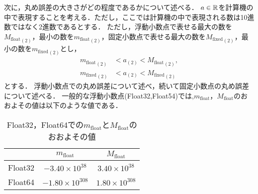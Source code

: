 次に，丸め誤差の大きさがどの程度であるかについて述べる．
$a \in \mathbb{R}$を計算機の中で表現することを考える．ただし，ここでは計算機の中で表現される数は10進数ではなく2進数であるとする．
ただし，浮動小数点で表せる最大の数を${M_{\mathrm{float}}}_{(2)}$，最小の数を${m_{\mathrm{float}}}_{(2)}$，固定小数点で表せる最大の数を${M_{\mathrm{fixed}}}_{(2)}$，最小の数を${m_{\mathrm{fixed}}}_{(2)}$とし，
\begin{align}
   {m_{\mathrm{float}}}_{(2)} &< a_{(2)} < {M_{\mathrm{float}}}_{(2)}, \\
   {m_{\mathrm{fixed}}}_{(2)} &< a_{(2)} < {M_{\mathrm{fixed}}}_{(2)}
\end{align}
とする．
浮動小数点での丸め誤差について述べ，続いて固定小数点の丸め誤差について述べる．
一般的な浮動小数点(Float32,Float54)では,$m_{\mathrm{float}}$，$M_{\mathrm{float}}$のおおよその値は以下のような値である．
\begin{table}[H]
    \centering
    \caption{Float32，Float64での$m_{\mathrm{float}}$と$M_{\mathrm{float}}$のおおよその値}
    \begin{tabular}{c|c|c}
         & $m_{\mathrm{float}}$ & $M_{\mathrm{float}}$ \\ \hline \hline
         Float32 & $-3.40 \times 10^{38}$ & $3.40 \times 10^{38}$ \\ \hline
         Float64 & $-1.80 \times 10^{308}$ & $1.80 \times 10^{308}$
    \end{tabular}
\end{table}

